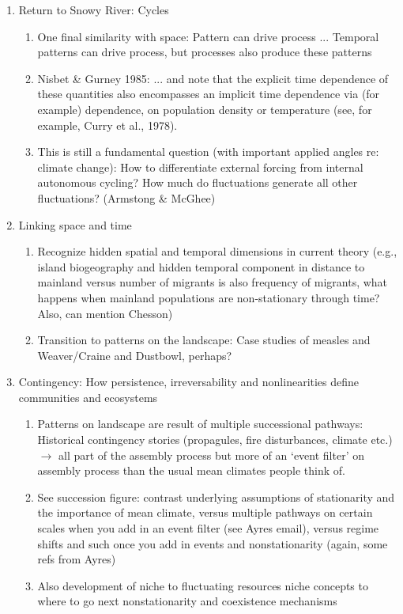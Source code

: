 \documentclass[11pt,a4paper]{article}
\begin{document}
\begin{enumerate}
\begin{enumerate}
\item Return to Snowy River: Cycles
\begin{enumerate}
\item One final similarity with space: Pattern can drive process ... Temporal patterns can drive process, but processes also produce these patterns 
\item Nisbet \& Gurney 1985: ... and note that the explicit time dependence of these quantities also encompasses an implicit time dependence via (for example) dependence, on population density or temperature (see, for example, Curry et al., 1978).
\item This is still a fundamental question (with important applied angles re: climate change): How to differentiate external forcing from internal autonomous cycling? How much do fluctuations generate all other fluctuations? (Armstong \& McGhee)
\end{enumerate}
\item Linking space and time
\begin{enumerate}
\item Recognize hidden spatial and temporal dimensions in current theory (e.g., island biogeography and hidden temporal component in distance to mainland versus number of migrants is also frequency of migrants, what happens when mainland populations are non-stationary through time? Also, can mention Chesson)
\item Transition to patterns on the landscape: Case studies of measles and Weaver/Craine and Dustbowl, perhaps?
\end{enumerate}
\item Contingency: How persistence, irreversability and nonlinearities define communities and ecosystems
\begin{enumerate}
\item Patterns on landscape are result of multiple successional pathways: Historical contingency stories (propagules, fire disturbances, climate etc.) \(\rightarrow\) all part of the assembly process but more of an `event filter' on assembly process than the usual mean climates people think of.
\item See succession figure: contrast underlying assumptions of stationarity and the importance of mean climate, versus multiple pathways on certain scales when you add in an event filter (see Ayres email), versus regime shifts and such once you add in events and nonstationarity (again, some refs from Ayres)
\item Also development of niche to fluctuating resources niche concepts to where to go next nonstationarity and coexistence mechanisms 

\end{enumerate}
\end{enumerate}
\end{enumerate}
\end{document}
